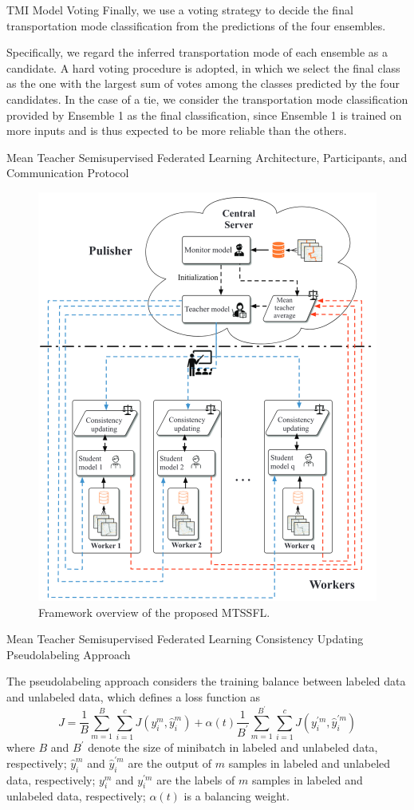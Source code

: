 \documentclass[UTF8]{beamer}
\begin{document}
\begin{frame}
{TMI Model}
{Voting}
Finally, we use a voting strategy to decide the final transportation mode classification from the predictions of the four ensembles. 

Specifically, we regard the inferred transportation mode of each ensemble as a candidate. \alert{A hard voting procedure} is adopted, in which we select the final class as the one with the largest sum of votes among the classes predicted by the four candidates. In the case of a tie, we consider the transportation mode classification provided by Ensemble 1 as the final classification, since Ensemble 1 is trained on more inputs and is thus expected to be more reliable than the others.
\end{frame}

\begin{frame}
{Mean Teacher Semisupervised Federated Learning}
{Architecture, Participants, and Communication Protocol}

\begin{figure}[ht]
\centering
\includegraphics[height=0.54\textwidth]{images/fl}
\caption{Framework overview of the proposed MTSSFL.} 
\end{figure}
\end{frame}

\begin{frame}
{Mean Teacher Semisupervised Federated Learning}
{Consistency Updating}
{Pseudolabeling Approach}

The pseudolabeling approach considers the training balance between labeled data and unlabeled data, which defines a loss function as
\begin{equation}
J=\frac{1}{B} \sum_{m=1}^B \sum_{i=1}^c J\left(y_i^m, \hat{y}_i^m\right)+\alpha(t) \frac{1}{B^{\prime}} \sum_{m=1}^{B^{\prime}} \sum_{i=1}^c J\left(y_i^{\prime m}, \hat{y}_i^{\prime m}\right)
\end{equation}
where $B$ and $B^{\prime}$ denote the size of minibatch in labeled and unlabeled data, respectively; $\hat{y}_i^m$ and $\hat{y}_i^{\prime m}$ are the output of $m$ samples in labeled and unlabeled data, respectively; $y_i^m$ and $y_i^{\prime m}$ are the labels of $m$ samples in labeled and unlabeled data, respectively; $\alpha(t)$ is a balancing weight.

\end{frame}
\end{document}
